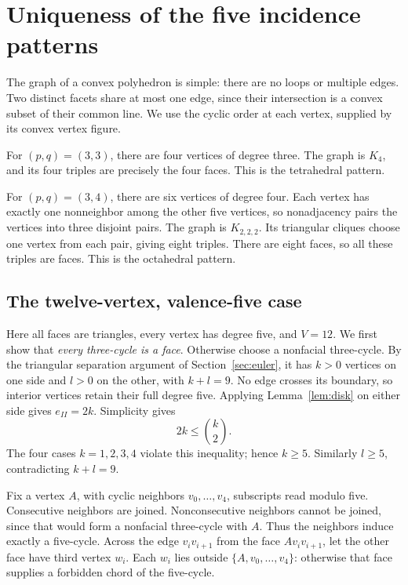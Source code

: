 \section{Uniqueness of the five incidence patterns}\label{sec:maps}

The graph of a convex polyhedron is simple: there are no loops or
multiple edges. Two distinct facets share at most one edge, since
their intersection is a convex subset of their common line. We use
the cyclic order at each vertex, supplied by its convex vertex figure.

For $(p,q)=(3,3)$, there are four vertices of degree three. The graph
is $K_4$, and its four triples are precisely the four faces. This is
the tetrahedral pattern.

For $(p,q)=(3,4)$, there are six vertices of degree four. Each vertex
has exactly one nonneighbor among the other five vertices, so
nonadjacency pairs the vertices into three disjoint pairs. The graph
is $K_{2,2,2}$. Its triangular cliques choose one vertex from each
pair, giving eight triples. There are eight faces, so all these
triples are faces. This is the octahedral pattern.

\subsection{The twelve-vertex, valence-five case}

Here all faces are triangles, every vertex has degree five, and
$V=12$. We first show that \emph{every three-cycle is a face}.
Otherwise choose a nonfacial three-cycle. By the triangular separation
argument of Section~\ref{sec:euler}, it has $k>0$ vertices on one side
and $l>0$ on the other, with $k+l=9$. No edge crosses its boundary,
so interior vertices retain their full degree five. Applying
Lemma~\ref{lem:disk} on either side gives $e_{II}=2k$. Simplicity gives
\[
 2k\leq\binom k2.
\]
The four cases $k=1,2,3,4$ violate this inequality; hence $k\geq5$.
Similarly $l\geq5$, contradicting $k+l=9$.

Fix a vertex $A$, with cyclic neighbors $v_0,\ldots,v_4$, subscripts
read modulo five. Consecutive neighbors are joined. Nonconsecutive
neighbors cannot be joined, since that would form a nonfacial
three-cycle with $A$. Thus the neighbors induce exactly a five-cycle.
Across the edge $v_iv_{i+1}$ from the face $Av_iv_{i+1}$, let the other
face have third vertex $w_i$. Each $w_i$ lies outside
$\{A,v_0,\ldots,v_4\}$: otherwise that face supplies a forbidden
chord of the five-cycle.

